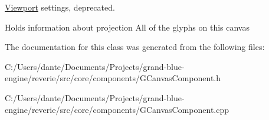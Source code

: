 \mbox{\hyperlink{classrev_1_1_viewport}{Viewport}} settings, deprecated. 

Holds information about projection All of the glyphs on this canvas 

The documentation for this class was generated from the following files\+:\begin{DoxyCompactItemize}
\item 
C\+:/\+Users/dante/\+Documents/\+Projects/grand-\/blue-\/engine/reverie/src/core/components/G\+Canvas\+Component.\+h\item 
C\+:/\+Users/dante/\+Documents/\+Projects/grand-\/blue-\/engine/reverie/src/core/components/G\+Canvas\+Component.\+cpp\end{DoxyCompactItemize}

